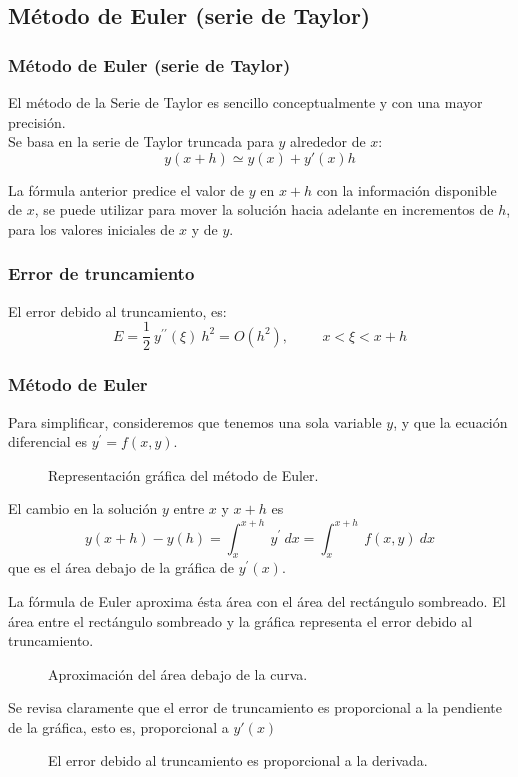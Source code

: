 \subsection{Método de Euler (serie de Taylor)}
\begin{frame}
\frametitle{Método de Euler (serie de Taylor)}
El método de la Serie de Taylor es sencillo conceptualmente y con una mayor precisión.
\\
\medskip
Se basa en la serie de Taylor truncada para $y$ alrededor de $x$:
\[ y(x+h) \simeq y(x) + y'(x) h  \]
\end{frame}
\begin{frame}
La fórmula anterior predice el valor de $y$ en $x+h$ con la información disponible de $x$, se puede utilizar para mover la solución hacia adelante en incrementos de $h$, para los valores iniciales de $x$ y de $y$.
\end{frame}
\begin{frame}
\frametitle{Error de truncamiento}
El error debido al truncamiento, es:
\[ E = \dfrac{1}{2} \: y^{\prime \prime} (\xi) \:  h^{2} = O(h^{2}), \hspace{1cm} x < \xi < x + h \]
\end{frame}
\begin{frame}
\frametitle{Método de Euler}
Para simplificar, consideremos que tenemos una sola variable $y$, y que la ecuación diferencial es $y^{\prime} = f(x, y)$.
\begin{figure}
	\centering
	
	\caption{Representación gráfica del método de Euler.}
\end{figure}
\end{frame}
\begin{frame}
El cambio en la solución $y$ entre $x$ y $x + h$ es
\[ y(x + h) - y(h) = \int_{x}^{x + h} \: y^{\prime} \: dx = \int_{x}^{x + h} \: f(x, y) \: dx \]
que es el área debajo de la gráfica de $y^{\prime}(x)$.
\end{frame}
\begin{frame}
La fórmula de Euler aproxima ésta área con el área del rectángulo sombreado. El área entre el rectángulo sombreado y la gráfica representa el error debido al truncamiento.
\begin{figure}
	\centering
	
	\caption{Aproximación del área debajo de la curva.}
\end{figure}
\end{frame}
\begin{frame}
Se revisa claramente que el error de truncamiento es proporcional a la pendiente de la gráfica, esto es, proporcional a $y'(x)$
\begin{figure}
	\centering
	
	\caption{El error debido al truncamiento es proporcional a la derivada.}
\end{figure}
\end{frame}
